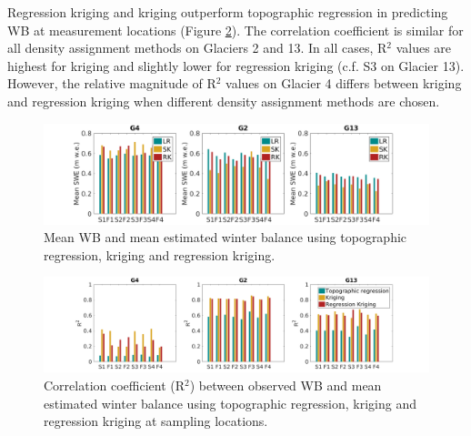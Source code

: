 \documentclass{sfuthesis}
\begin{document}
Regression kriging and kriging outperform topographic regression in predicting WB at measurement locations (Figure \ref{fig:InterpMethod_alloptsR2}). The correlation coefficient is similar for all density assignment methods on Glaciers 2 and 13. In all cases, R$^2$ values are highest for kriging and slightly lower for regression kriging (c.f. S3 on Glacier 13). However, the relative magnitude of R$^2$ values on Glacier 4 differs between kriging and regression kriging when different density assignment methods are chosen.  

\begin{landscape}
\begin{figure}
	\includegraphics[height=0.38\textwidth]{InterpMethod_allopts.png}%
	\caption{Mean WB and mean estimated winter balance using topographic regression, kriging and regression kriging.}
	\label{fig:InterpMethod_allopts}
\end{figure}

\begin{figure}
	\includegraphics[height=0.38\textwidth]{InterpMethod_alloptsR2.png}%
	\caption{Correlation coefficient (R$^2$) between observed WB and mean estimated winter balance using topographic regression, kriging and regression kriging at sampling locations.}
	\label{fig:InterpMethod_alloptsR2}
\end{figure}
\end{landscape}
\end{document}
